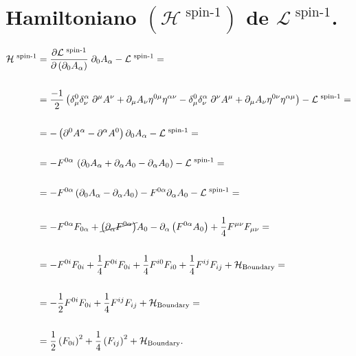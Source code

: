 \newpage
\section{Hamiltoniano $(\mathcal{H}^{\text{ spin-1}})$ de $\mathcal{L}^{\text{ spin-1}}$.}\label{AppendixI:LHamiltonianDensity}


\begin{equation}
\begin{split}
	\mathcal{H^{\text{ spin-1}}} &= 
	\frac{\partial \mathcal{L}^{\text{ spin-1}} }{\partial \left(\partial_{0}A_{\alpha}\right) } \;\partial_{0}A_{\alpha} - \mathcal{L}^{\text{ spin-1}} = \\ \\
	&= \frac{-1}{2} \left( \delta^{0}_{\mu} \delta^{\alpha}_{\nu} \;\partial^{\mu}A^{\nu} + \partial_{\mu}A_{\nu} \eta^{0\mu} \eta^{\alpha \nu} -  \delta^{0}_{\mu} \delta^{\alpha}_{\nu} \;\partial^{\nu}A^{\mu} + \partial_{\mu}A_{\nu} \eta^{0\nu} \eta^{\alpha \mu}  \right) - \mathcal{L}^{\text{ spin-1}} = \\ \\
	&= - \left( \partial^{0}A^{\alpha} - \partial^{\alpha}A^{0} \right)\partial_{0}A_{\alpha} -  \mathcal{L}^{\text{ spin-1}} = \\ \\
	&= - F^{0\alpha}\, \left(\partial_{0}A_{\alpha} + \partial_{\alpha}A_{0} - \partial_{\alpha}A_{0}    \right) - \mathcal{L}^{\text{ spin-1}} = \\ \\
	&= -F^{0\alpha}\left(\partial_{0}A_{\alpha} - \partial_{\alpha}A_{0}\right) - F^{0\alpha}\partial_{\alpha}A_{0} - \mathcal{L}^{\text{ spin-1}} = \\ \\
	&= -F^{0\alpha}F_{0\alpha} + \cancel{\left(\partial_{\alpha}F^{0\alpha}\right)} A_{0} - \partial_{\alpha}\left(F^{0\alpha} A_{0}\right)  + \frac{1}{4}F^{\mu\nu}F_{\mu\nu} = \\ \\
	&= - F^{0i}F_{0i} + \frac{1}{4}F^{0i}F_{0i}  + \frac{1}{4}F^{i0}F_{i0} + \frac{1}{4}F^{ij}F_{ij} + \mathcal{H}_{\text{Boundary}}= \\ \\
	&= -\frac{1}{2}F^{0i}F_{0i} + \frac{1}{4}F^{ij}F_{ij}  + \mathcal{H}_{\text{Boundary}}= \\ \\
	&= \frac{1}{2} \left(F_{0i}\right)^{2} + \frac{1}{4}\left(F_{ij}\right)^{2} + \mathcal{H}_{\text{Boundary}}.
\end{split}
\end{equation}

